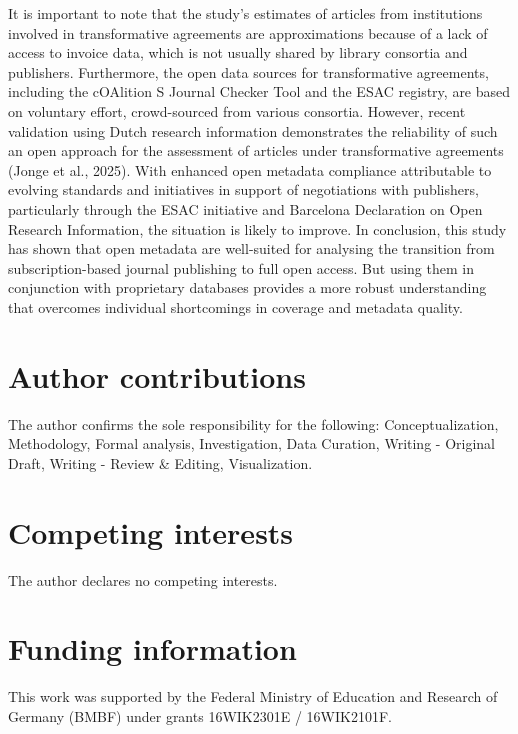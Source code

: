 \documentclass[a4paper,man,floatsintext,longtable,noextraspace,10pt]{apa6}
\begin{document}
It is important to note that the study's estimates of articles from
institutions involved in transformative agreements are approximations
because of a lack of access to invoice data, which is not usually shared
by library consortia and publishers. Furthermore, the open data sources
for transformative agreements, including the cOAlition S Journal Checker
Tool and the ESAC registry, are based on voluntary effort, crowd-sourced
from various consortia. However, recent validation using Dutch research
information demonstrates the reliability of such an open approach for
the assessment of articles under transformative agreements (Jonge et
al., 2025). With enhanced open metadata compliance attributable to
evolving standards and initiatives in support of negotiations with
publishers, particularly through the ESAC initiative and Barcelona
Declaration on Open Research Information, the situation is likely to
improve. In conclusion, this study has shown that open metadata are
well-suited for analysing the transition from subscription-based journal
publishing to full open access. But using them in conjunction with
proprietary databases provides a more robust understanding that
overcomes individual shortcomings in coverage and metadata quality.

\section*{Author contributions}\label{author-contributions}

The author confirms the sole responsibility for the following:
Conceptualization, Methodology, Formal analysis, Investigation, Data
Curation, Writing - Original Draft, Writing - Review \& Editing,
Visualization.

\section*{Competing interests}\label{competing-interests}

The author declares no competing interests.

\section*{Funding information}\label{funding-information}

This work was supported by the Federal Ministry of Education and
Research of Germany (BMBF) under grants 16WIK2301E / 16WIK2101F.
\end{document}
